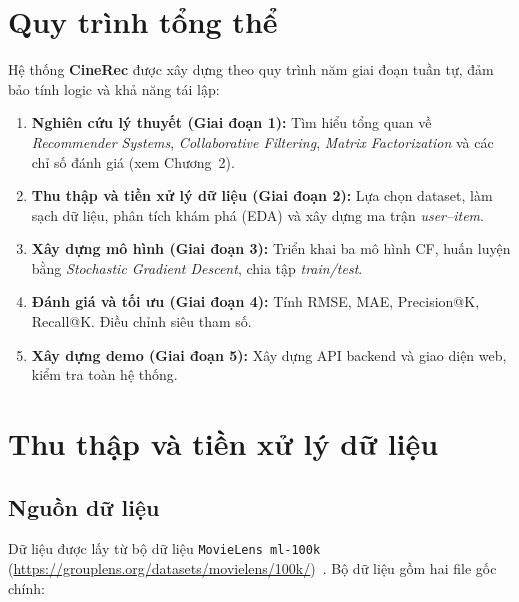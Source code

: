 \documentclass[../BTL.tex]{subfiles}
\begin{document}

\section{Quy trình tổng thể}
\label{section:3.1}

Hệ thống \textbf{CineRec} được xây dựng theo quy trình năm giai đoạn tuần tự,
đảm bảo tính logic và khả năng tái lập:

\begin{enumerate}[itemsep=0.4em]
    \item \textbf{Nghiên cứu lý thuyết (Giai đoạn 1):} Tìm hiểu tổng quan về
    \textit{Recommender Systems}, \textit{Collaborative Filtering},
    \textit{Matrix Factorization} và các chỉ số đánh giá (xem Chương~2).

    \item \textbf{Thu thập và tiền xử lý dữ liệu (Giai đoạn 2):} Lựa chọn
    dataset, làm sạch dữ liệu, phân tích khám phá (EDA) và xây dựng ma trận
    \textit{user--item}.

    \item \textbf{Xây dựng mô hình (Giai đoạn 3):} Triển khai ba mô hình CF,
    huấn luyện bằng \textit{Stochastic Gradient Descent}, chia tập
    \textit{train/test}.

    \item \textbf{Đánh giá và tối ưu (Giai đoạn 4):} Tính RMSE, MAE,
    Precision@K, Recall@K. Điều chỉnh siêu tham số.

    \item \textbf{Xây dựng demo (Giai đoạn 5):} Xây dựng API backend và giao
    diện web, kiểm tra toàn hệ thống.
\end{enumerate}

\section{Thu thập và tiền xử lý dữ liệu}
\label{section:3.2}

\subsection{Nguồn dữ liệu}
\label{section:3.2.1}

Dữ liệu được lấy từ bộ dữ liệu \texttt{MovieLens ml-100k}
(\url{https://grouplens.org/datasets/movielens/100k/})~\cite{harper2015movielens}.
Bộ dữ liệu gồm hai file gốc chính:
\end{document}
